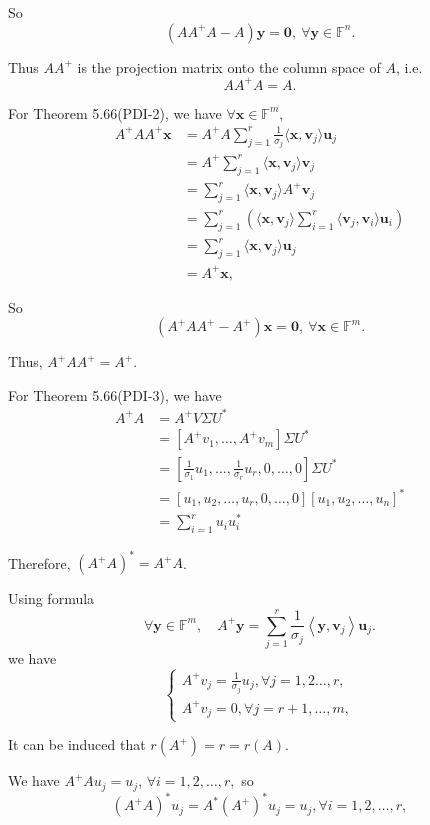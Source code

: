 \documentclass[a4paper]{article}
\begin{document}
So 
$$
(AA^+A-A)\mathbf{y}=\mathbf{0},\ \forall\mathbf{y}\in\mathbb{F}^n.
$$

Thus $AA^+$ is the projection matrix onto the column space of $A$, i.e.
$$
AA^+A=A.
$$

For Theorem 5.66(PDI-2), we have $\forall\mathbf{x}\in\mathbb{F}^m,$
$$
\begin{aligned}
  A^+A A^+\mathbf{x} &= A^+A\sum_{j=1}^r \frac{1}{\sigma_j} \langle \mathbf{x}, \mathbf{v}_j \rangle \mathbf{u}_j\\
  &= A^+\sum_{j=1}^r \langle \mathbf{x}, \mathbf{v}_j \rangle \mathbf{v}_j\\
  &= \sum_{j=1}^r \langle \mathbf{x}, \mathbf{v}_j \rangle A^+\mathbf{v}_j\\
  &= \sum_{j=1}^r (\langle \mathbf{x}, \mathbf{v}_j \rangle \sum_{i=1}^r \langle \mathbf{v}_j, \mathbf{v}_i \rangle \mathbf{u}_i)\\
  &=\sum_{j=1}^r \langle \mathbf{x}, \mathbf{v}_j \rangle \mathbf{u}_j\\
  &= A^+\mathbf{x},
\end{aligned}
$$

So 
$$
(A^{+}AA^+ - A^{+})\mathbf{x} = \mathbf{0},\ \forall\mathbf{x}\in\mathbb{F}^m.
$$

Thus, $A^{+}AA^+ = A^{+}$.

For Theorem 5.66(PDI-3), we have 
$$
\begin{aligned}
  A^+A&=A^+V\Sigma U^*\\
  &=[A^+v_1,\ldots,A^+v_m]\Sigma U^*\\
  &=[\frac{1}{\sigma_1}u_1, \ldots, \frac{1}{\sigma_r}u_r,0,\ldots,0]\Sigma U^*\\
  &=[u_1,u_2,\ldots,u_r,0,\ldots,0][u_1,u_2,\ldots,u_n]^*\\
  &=\sum_{i=1}^{r}u_iu_i^*
\end{aligned}
$$

Therefore, $(A^+A)^* = A^+A$.

Using formula 
$$
\forall\mathbf{y}\in\mathbb{F}^m,\quad A^+\mathbf{y}=\sum_{j=1}^r\frac{1}{\sigma_j}\left\langle\mathbf{y},\mathbf{v}_j\right\rangle\mathbf{u}_j.
$$
we have
$$
\left\{\begin{array}{l}
  A^+v_j=\frac{1}{\sigma_j}u_j,\forall j=1,2\ldots,r,\\
  A^+v_j=0,\forall j=r+1,\ldots,m,
  \end{array}\right.
$$

It can be induced that $r(A^+)=r=r(A)$.

We have $A^+Au_j=u_j$, $\forall i=1,2,\ldots, r,$ so
$$
(A^+A)^*u_j=A^*(A^+)^*u_j=u_j,\forall i=1,2,\ldots, r,
$$
\end{document}
